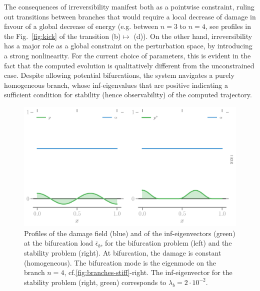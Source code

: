 The consequences of irreversibility manifest both as a pointwise constraint, ruling out transitions between branches that would require a local decrease of damage in favour of a global decrease of energy (e.g. between $n=3$ to $n=4$, see profiles in the Fig.~\ref{fig:kick} of the transition (b)$\mapsto$ (d)). 
On the other hand, irreversibility has a major role  as a global constraint on the perturbation space, by introducing a strong nonlinearity. For the current choice of parameters, this is evident in the fact that the computed evolution is qualitatively different from the unconstrained case. Despite allowing potential bifurcations, the system navigates a purely homogeneous branch, whose inf-eigenvalues that are positive indicating a sufficient condition for stability (hence observability) of the computed trajectory.

\begin{figure}[htbp]
    \centering
    \includegraphics*[width=.95\textwidth]{../images/profiles-bif-stab-7f4361886184f3c6791fe16bf4f4b3f2.pdf}
    
    \caption{Profiles of the damage field (blue) and of the inf-eigenvectors (green)  at the bifurcation load $\bar \epsilon_b$, for the bifurcation problem (left) and the stability problem (right).
    At bifurcation, the damage is constant (homogeneous). 
    The bifurcation mode is the eigenmode on the branch $n=4$, cf.\ref{fig:branches-stiff}-right. 
    The inf-eigenvector for the stability problem (right, green) corresponds to $\lambda_b=2\cdot 10^{-2}$.}
      \label{fig:irreversibility-profiles}
\end{figure}

